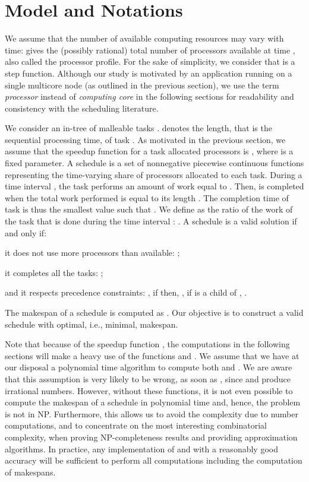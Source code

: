 \documentclass{llncs}
\newcommand{\fctofproc}{{processor profile}\xspace}
\begin{document}
\section{Model and Notations}
\label{sec:model}

We assume that the number of available computing resources may vary
with time:  gives the (possibly rational) total number of processors
available at time , also called the \fctofproc. For the sake of
simplicity, we consider that  is a step function. Although our
study is motivated by an application running on a single multicore
node (as outlined in the previous section), we use the term
\emph{processor} instead of \emph{computing core} in the following
sections for readability and consistency with the scheduling
literature.

We consider an in-tree  of  malleable tasks .
 denotes the length, that is the sequential processing time, of
task .  As motivated in the previous section, we assume that the
speedup function for a task allocated  processors is ,
where  is a fixed parameter.
A schedule  is a set of nonnegative piecewise continuous functions
 representing the time-varying
share of processors allocated to each task. During a time interval
, the task  performs an amount of work equal to . Then,  is completed when the total work
performed is equal to its length . The completion time of task
 is thus the smallest value  such that .
We define  as the ratio of the
work of the task  that is done during the time interval :
.  A schedule is a
valid solution if and only if:
\begin{compactitem}
\item it does not use more processors than available: ;
\item it completes all the tasks: ;
\item and it respects precedence constraints:
  , if  then, ,
  if  is a child of , .
\end{compactitem}
The makespan  of a schedule is computed as . Our objective is to construct a valid
schedule with optimal, i.e., minimal, makespan.



Note that because of the speedup function , the computations
in the following sections will make a heavy use of the functions
 and . We assume that
we have at our disposal a polynomial time algorithm to compute both
 and . We are aware that this assumption is very likely to be
wrong, as soon as , since  and  produce irrational
numbers. However, without these functions, it is not even possible to
compute the makespan of a schedule in polynomial time and, hence, the
problem is not in NP. Furthermore, this allows us to avoid the
complexity due to number computations, and to concentrate on the most
interesting combinatorial complexity, when proving NP-completeness
results and providing approximation algorithms. In practice, any
implementation of  and  with a reasonably good accuracy will be
sufficient to perform all computations including the computation
of makespans.
\end{document}

